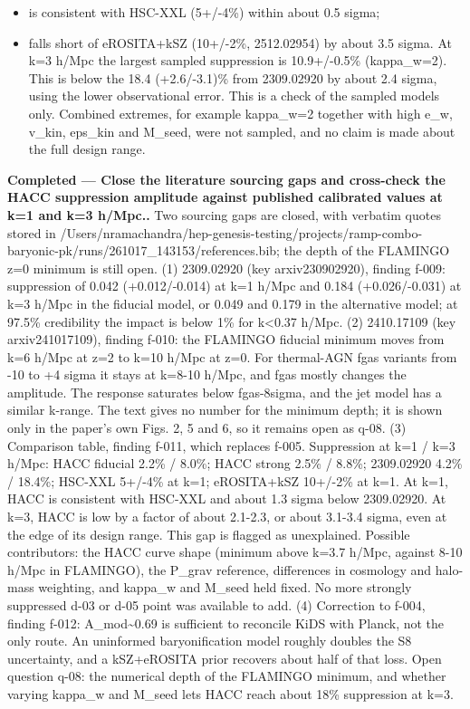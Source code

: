 \documentclass[11pt,a4paper]{article}
\begin{document}
\begin{itemize}
  \item is consistent with HSC-XXL (5+/-4\%) within about 0.5 sigma;
  \item falls short of eROSITA+kSZ (10+/-2\%, 2512.02954) by about 3.5 sigma.
At k=3 h/Mpc the largest sampled suppression is 10.9+/-0.5\% (kappa\_w=2). This is below the 18.4 (+2.6/-3.1)\% from 2309.02920 by about 2.4 sigma, using the lower observational error. This is a check of the sampled models only. Combined extremes, for example kappa\_w=2 together with high e\_w, v\_kin, eps\_kin and M\_seed, were not sampled, and no claim is made about the full design range.

\end{itemize}
\textbf{Completed --- Close the literature sourcing gaps and cross-check the HACC suppression amplitude against published calibrated values at k=1 and k=3 h/Mpc..} Two sourcing gaps are closed, with verbatim quotes stored in /Users/nramachandra/hep-genesis-testing/projects/ramp-combo-baryonic-pk/runs/261017\_143153/references.bib; the depth of the FLAMINGO z=0 minimum is still open. (1) 2309.02920 (key arxiv230902920), finding f-009: suppression of 0.042 (+0.012/-0.014) at k=1 h/Mpc and 0.184 (+0.026/-0.031) at k=3 h/Mpc in the fiducial model, or 0.049 and 0.179 in the alternative model; at 97.5\% credibility the impact is below 1\% for k\textless{}0.37 h/Mpc. (2) 2410.17109 (key arxiv241017109), finding f-010: the FLAMINGO fiducial minimum moves from k=6 h/Mpc at z=2 to k=10 h/Mpc at z=0. For thermal-AGN fgas variants from -10 to +4 sigma it stays at k=8-10 h/Mpc, and fgas mostly changes the amplitude. The response saturates below fgas-8sigma, and the jet model has a similar k-range. The text gives no number for the minimum depth; it is shown only in the paper's own Figs. 2, 5 and 6, so it remains open as q-08. (3) Comparison table, finding f-011, which replaces f-005. Suppression at k=1 / k=3 h/Mpc: HACC fiducial 2.2\% / 8.0\%; HACC strong 2.5\% / 8.8\%; 2309.02920 4.2\% / 18.4\%; HSC-XXL 5+/-4\% at k=1; eROSITA+kSZ 10+/-2\% at k=1. At k=1, HACC is consistent with HSC-XXL and about 1.3 sigma below 2309.02920. At k=3, HACC is low by a factor of about 2.1-2.3, or about 3.1-3.4 sigma, even at the edge of its design range. This gap is flagged as unexplained. Possible contributors: the HACC curve shape (minimum above k=3.7 h/Mpc, against 8-10 h/Mpc in FLAMINGO), the P\_grav reference, differences in cosmology and halo-mass weighting, and kappa\_w and M\_seed held fixed. No more strongly suppressed d-03 or d-05 point was available to add. (4) Correction to f-004, finding f-012: A\_mod\textasciitilde{}0.69 is sufficient to reconcile KiDS with Planck, not the only route. An uninformed baryonification model roughly doubles the S8 uncertainty, and a kSZ+eROSITA prior recovers about half of that loss. Open question q-08: the numerical depth of the FLAMINGO minimum, and whether varying kappa\_w and M\_seed lets HACC reach about 18\% suppression at k=3.
\end{document}
